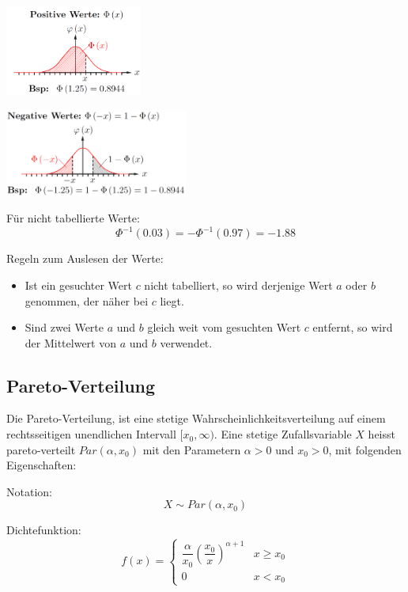 \documentclass[10pt,a4paper,twocolumn]{article}
\begin{document}
\begin{center}
\includegraphics[width=45mm]{standardnormalverteilung_tabelle1.png}
\end{center}
\begin{center}
\includegraphics[width=60mm]{standardnormalverteilung_tabelle2.png}
\end{center}

Für nicht tabellierte Werte:
\[
\Phi^{-1}(0.03)=-\Phi^{-1}(0.97)=-1.88
\]

Regeln zum Auslesen der Werte:
\begin{itemize}
\item Ist ein gesuchter Wert $c$ nicht tabelliert, so wird derjenige Wert $a$ oder $b$ genommen, der näher bei $c$ liegt.
\item Sind zwei Werte $a$ und $b$ gleich weit vom gesuchten Wert $c$ entfernt, so wird der Mittelwert von $a$ und $b$ verwendet.
\end{itemize}

\subsection{Pareto-Verteilung}
Die Pareto-Verteilung, ist eine stetige Wahrscheinlichkeitsverteilung auf einem rechtsseitigen unendlichen Intervall $[x_0, \infty)$. Eine stetige Zufallsvariable $X$ heisst pareto-verteilt $Par(\alpha, x_0)$ mit den Parametern $\alpha > 0$ und $x_0 > 0$, mit folgenden Eigenschaften:

\vspace{10pt}

Notation:
\[
X \sim Par(\alpha, x_0)
\]

Dichtefunktion:
\[
f(x) =\begin{cases}
			\dfrac{\alpha}{x_0}\left(\dfrac{x_0}{x}\right)^{\alpha + 1} & x \geq x_0\\
			0 & x < x_0
		\end{cases}
\]
\end{document}
